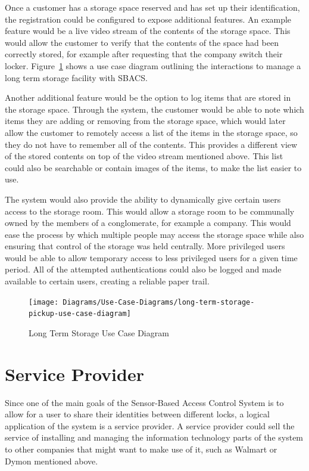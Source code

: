 \documentclass[12pt]{report}
\let\Oldsection\section
\renewcommand{\section}{\FloatBarrier\Oldsection}
\begin{document}
Once a customer has a storage space reserved and has set up their identification, the registration could be configured
to expose additional features. An example feature would be a live video stream of the contents of the storage space.
This would allow the customer to verify that the contents of the space had been correctly stored, for example after
requesting that the company switch their locker. Figure~\ref{fig:long-term-storage-pickup-use-case-diagram} shows
a use case diagram outlining the interactions to manage a long term storage facility with SBACS.

Another additional feature would be the option to log items that are stored in the storage space. Through the system, the
customer would be able to note which items they are adding or removing from the storage space, which would later allow the
customer to remotely access a list of the items in the storage space, so they do not have to remember all of the contents.
This provides a different view of the stored contents on top of the video stream mentioned above. This list could also be
searchable or contain images of the items, to make the list easier to use.

The system would also provide the ability to dynamically give certain users access to the storage room. This would allow
a storage room to be communally owned by the members of a conglomerate, for example a company. This would ease the
process by which multiple people may access the storage space while also ensuring that control of the storage was held
centrally. More privileged users would be able to allow temporary access to less privileged users for a given time
period. All of the attempted authentications could also be logged and made available to certain users, creating a
reliable paper trail.

\begin{figure}
    \texttt{[image: Diagrams/Use-Case-Diagrams/long-term-storage-pickup-use-case-diagram]}
    \caption{Long Term Storage Use Case Diagram}
    \label{fig:long-term-storage-pickup-use-case-diagram}
\end{figure}


\section{Service Provider} \label{service-provider}

Since one of the main goals of the Sensor-Based Access Control System is to allow for a user to share their identities
between different locks, a logical application of the system is a service provider. A service provider could sell the service
of installing and managing the information technology parts of the system to other companies that might want to
make use of it, such as Walmart or Dymon mentioned above.
\end{document}
